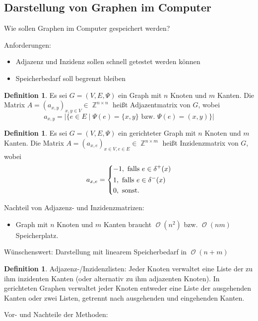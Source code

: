 \documentclass[a4paper,12pt]{article}
\DeclareMathOperator{\Z}{\mathbb Z}
\DeclareMathOperator{\BigO}{\mathcal O}
\theoremstyle{definition}
\newtheorem{definition}[axiom]{Definition}
\begin{document}
	\setcounter{section}{6}
	\setcounter{subsection}{10}
	\subsection{Darstellung von Graphen im Computer}
	Wie sollen Graphen im Computer gespeichert werden?
	
	Anforderungen:
	\begin{itemize}
		\item Adjazenz und Inzidenz sollen schnell getestet werden können
		\item Speicherbedarf soll begrenzt bleiben
	\end{itemize}
	\begin{definition}
		Es sei $G = (V, E, \Psi)$ ein Graph mit $n$ Knoten und $m$ Kanten. Die Matrix $A = (a_{x,y})_{x,y\in V} \in \Z^{n\times n}$ heißt Adjazentmatrix von $G$, wobei
		\[
			a_{x,y} = \lvert \{e \in E \mid \Psi(e) = \{x,y\} \text{ bzw. } \Psi(e) = (x,y)\} \rvert
		\]
	\end{definition}
	\begin{definition}
		Es sei $G = (V, E, \Psi)$ ein gerichteter Graph mit $n$ Knoten und $m$ Kanten. Die Matrix $A = (a_{x,e})_{x\in V, e \in E} \in \Z^{n \times m}$ heißt Inzidenzmatrix von $G$, wobei
		\[
			a_{x,e} = \begin{dcases*}
				-1, \text{ falls } e \in \delta^+(x)\\
				1, \text{ falls } e \in \delta^-(x)\\
				0, \text{ sonst.}
			\end{dcases*}
		\]
	\end{definition}
	Nachteil von Adjazenz- und Inzidenzmatrizen:
	\begin{itemize}
		\item Graph mit $n$ Knoten und $m$ Kanten braucht $\BigO(n^2)$ bzw. $\BigO(nm)$ Speicherplatz.
	\end{itemize}
	Wünschenswert: Darstellung mit linearem Speicherbedarf in $\BigO(n + m)$
	
	\begin{definition}
		Adjazenz-/Inzidenzlisten: Jeder Knoten verwaltet eine Liste der zu ihm inzidenten Kanten (oder alternativ zu ihm adjazenten Knoten). In gerichteten Graphen verwaltet jeder Knoten entweder eine Liste der ausgehenden Kanten oder zwei Listen, getrennt nach ausgehenden und eingehenden Kanten.
	\end{definition}
	Vor- und Nachteile der Methoden:
	
\end{document}
